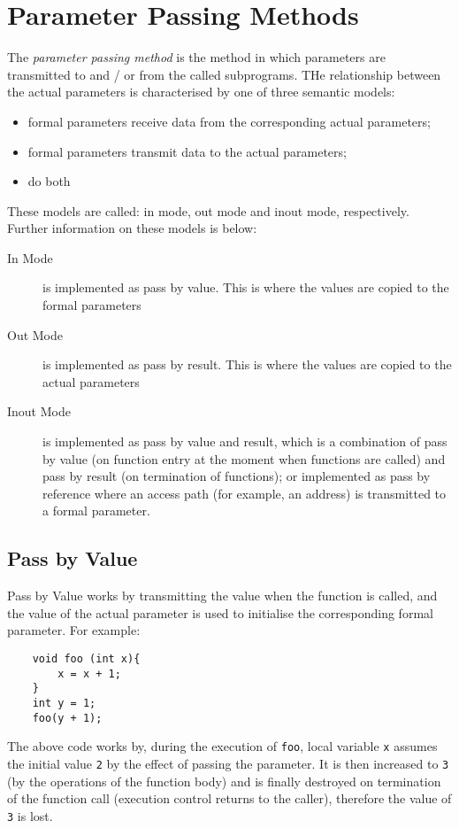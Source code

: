 \section{Parameter Passing Methods}
The \textit{parameter passing method} is the method in which parameters are transmitted to and / or from the called subprograms. THe relationship between the actual parameters is characterised by one of three semantic models:
\begin{itemize}
    \item formal parameters receive data from the corresponding actual parameters;
    \item formal parameters transmit data to the actual parameters; 
    \item do both
\end{itemize}

These models are called: in mode, out mode and inout mode, respectively. Further information on these models is below:
\begin{description}
    \item[In Mode] is implemented as pass by value. This is where the values are copied to the formal parameters
    \item[Out Mode] is implemented as pass by result. This is where the values are copied to the actual parameters
    \item[Inout Mode] is implemented as pass by value and result, which is a combination of pass by value (on function entry at the moment when functions are called) and pass by result (on termination of functions); or implemented as pass by reference where an access path (for example, an address) is transmitted to a formal parameter. 
\end{description}

\subsection{Pass by Value}
Pass by Value works by transmitting the value when the function is called, and the value of the actual parameter is used to initialise the corresponding formal parameter. For example:
\begin{verbatim}
    void foo (int x){
        x = x + 1;
    }
    int y = 1;
    foo(y + 1);
\end{verbatim}
The above code works by, during the execution of \verb|foo|, local variable \verb|x| assumes the initial value \verb|2| by the effect of passing the parameter. It is then increased to \verb|3| (by the operations of the function body) and is finally destroyed on termination of the function call (execution control returns to the caller), therefore the value of \verb|3| is lost. \\

